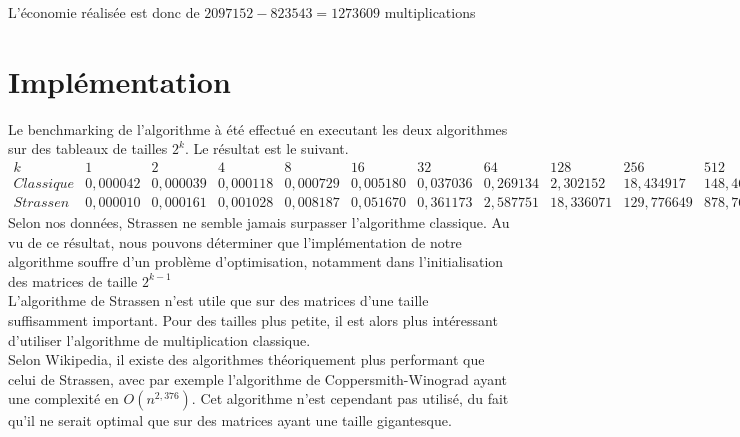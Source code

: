\documentclass[a4paper,10pt,margin=2in]{report}
\begin{document}
L'économie réalisée est donc de $2 097 152 - 823543 = 1 273 609$ multiplications

\chapter{Implémentation}
Le benchmarking de l'algorithme à été effectué en executant les deux algorithmes sur des tableaux de tailles $2^k$. Le résultat est le suivant.\\

$\begin{array}{ *{13}{c} }
k & 1 & 2 & 4 & 8 & 16 & 32 & 64 & 128 & 256 & 512 & 1024 & 2048 \\
Classique & 0,000042 & 0,000039 & 0,000118 & 0,000729 & 0,005180 & 0,037036 & 0,269134 & 2,302152 & 18,434917 & 148,468258 & 1143,45661 & 9189,38358 \\
Strassen & 0,000010 & 0,000161 & 0,001028 & 0,008187 & 0,051670 & 0,361173 & 2,587751 & 18,336071 & 129,776649 & 878,765119 & 6224,82734 & 42726,193543
\end{array}$
\\

Selon nos données, Strassen ne semble jamais surpasser l'algorithme classique. Au vu de ce résultat, nous pouvons déterminer que l'implémentation de notre algorithme souffre d'un problème d'optimisation, notamment dans l'initialisation des matrices de taille $2^{k-1}$\\

L'algorithme de Strassen n'est utile que sur des matrices d'une taille suffisamment important. Pour des tailles plus petite, il est alors plus intéressant d'utiliser l'algorithme de multiplication classique.\\

Selon Wikipedia, il existe des algorithmes théoriquement plus performant que celui de Strassen, avec par exemple l'algorithme de Coppersmith-Winograd ayant une complexité en $O(n^{2,376})$. Cet algorithme n'est cependant pas utilisé, du fait qu'il ne serait optimal que sur des matrices ayant une taille gigantesque.
\end{document}
